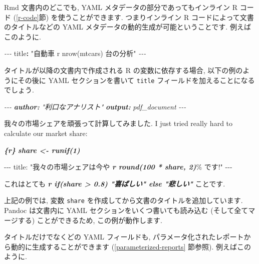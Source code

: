 \documentclass[
  11pt,
]{bxjsreport}
\newenvironment{Shaded}{\begin{snugshade}}{\end{snugshade}}
\newcommand{\AnnotationTok}[1]{\textcolor[rgb]{0.56,0.35,0.01}{\textbf{\textit{#1}}}}
\newcommand{\AttributeTok}[1]{\textcolor[rgb]{0.77,0.63,0.00}{#1}}
\newcommand{\CommentTok}[1]{\textcolor[rgb]{0.56,0.35,0.01}{\textit{#1}}}
\newcommand{\FunctionTok}[1]{\textcolor[rgb]{0.00,0.00,0.00}{#1}}
\newcommand{\InformationTok}[1]{\textcolor[rgb]{0.56,0.35,0.01}{\textbf{\textit{#1}}}}
\newcommand{\KeywordTok}[1]{\textcolor[rgb]{0.13,0.29,0.53}{\textbf{#1}}}
\newcommand{\NormalTok}[1]{#1}
\newcommand{\PreprocessorTok}[1]{\textcolor[rgb]{0.56,0.35,0.01}{\textit{#1}}}
\newcommand{\StringTok}[1]{\textcolor[rgb]{0.31,0.60,0.02}{#1}}
\begin{document}
Rmd 文書内のどこでも, YAML メタデータの部分であってもインライン R コード (\ref{r-code}節) を使うことができます. つまりインライン R コードによって文書のタイトルなどの YAML メタデータの動的生成が可能ということです. 例えばこのように.

\begin{Shaded}
\begin{Highlighting}[]
\PreprocessorTok{{-}{-}{-}}
\FunctionTok{title}\KeywordTok{:}\AttributeTok{ }\StringTok{"自動車 \textasciigrave{}r nrow(mtcars)\textasciigrave{} 台の分析"}
\PreprocessorTok{{-}{-}{-}}
\end{Highlighting}
\end{Shaded}

タイトルが以降の文書内で作成される R の変数に依存する場合, 以下の例のようにその後に YAML セクションを書いて \texttt{title} フィールドを加えることになるでしょう.

\begin{Shaded}
\begin{Highlighting}[]
\CommentTok{{-}{-}{-}}
\AnnotationTok{author:}\CommentTok{ "利口なアナリスト"}
\AnnotationTok{output:}\CommentTok{ pdf\_document}
\CommentTok{{-}{-}{-}}

\NormalTok{我々の市場シェアを頑張って計算してみました.}
\NormalTok{I just tried really hard to calculate our market share:}

\InformationTok{\textasciigrave{}\textasciigrave{}\textasciigrave{}\{r\}}
\InformationTok{share \textless{}{-} runif(1)}
\InformationTok{\textasciigrave{}\textasciigrave{}\textasciigrave{}}

\NormalTok{{-}{-}{-}}
\NormalTok{title: "我々の市場シェアは今や }\InformationTok{\textasciigrave{}r round(100 * share, 2)\textasciigrave{}}\NormalTok{\% です!"}
\NormalTok{{-}{-}{-}}

\NormalTok{これはとても }\InformationTok{\textasciigrave{}r if(share \textgreater{} 0.8) "喜ばしい" else "悲しい"\textasciigrave{}}\NormalTok{ ことです.}
\end{Highlighting}
\end{Shaded}

上記の例では, 変数 \texttt{share} を作成してから文書のタイトルを追加しています. Pandoc は文書内に YAML セクションをいくつ書いても読み込む (そして全てマージする) ことができるため, この例が動作します.

タイトルだけでなくどの YAML フィールドも, パラメータ化されたレポートから動的に生成することができます (\ref{parameterized-reports} 節参照). 例えばこのように.
\end{document}
